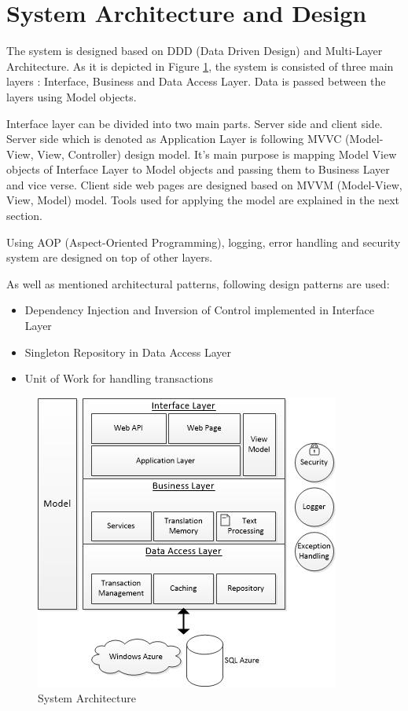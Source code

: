 \section{System Architecture and Design}
The system is designed based on DDD (Data Driven Design) and Multi-Layer Architecture. As it is depicted in Figure \ref{fig:architecture}, the system is consisted of three main layers : Interface, Business and Data Access Layer. Data is passed between the layers using Model objects.

Interface layer can be divided into two main parts. Server side and client side. Server side which is denoted as Application Layer is following MVVC (Model-View, View, Controller) design model. It's main purpose is mapping Model View objects of Interface Layer to Model objects and passing them to Business Layer and vice verse. Client side web pages are designed based on MVVM (Model-View, View, Model) model. Tools used for applying the model are explained in the next section.

Using AOP (Aspect-Oriented Programming), logging, error handling and security system are designed on top of other layers.

As well as mentioned architectural patterns, following design patterns are used:
\begin{itemize}
	\item Dependency Injection and Inversion of Control implemented in Interface Layer
	\item Singleton Repository in Data Access Layer
	\item Unit of Work for handling transactions
\end{itemize} 

\begin{figure}[h]
\begin{center}
\includegraphics[scale=0.9]{figures/architecture.jpg}
\caption{System Architecture
\label{fig:architecture}}
\end{center}
\end{figure}